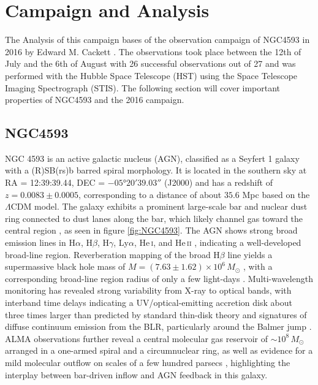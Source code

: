 \chapter{Campaign and Analysis}
\label{campaign_and_analysis}
The Analysis of this campaign bases of the observation campaign of NGC4593 in 2016 by Edward M. Cackett \parencite{cackett2018accretion}. The observations took place between the 12th of July and the 6th of August with 26 successful observations out of 27 and was performed with the Hubble Space Telescope (HST) using the Space Telescope Imaging Spectrograph (STIS). The following section will cover important properties of NGC4593 and the 2016 campaign.

\section{NGC4593}
\label{NGC4593}

NGC 4593 is an active galactic nucleus (AGN), classified as a Seyfert 1 galaxy with a \mbox{(R)SB(rs)b} barred spiral morphology. 
It is located in the southern sky at RA = 12:39:39.44, DEC = $-05$°$ 20' 39.03''$ (J2000) and has a redshift of $z = 0.0083 \pm 0.0005$, corresponding to a distance of about $35.6$ Mpc \parencite{simbaNGC4593} based on the $\Lambda$CDM model. 
The galaxy exhibits a prominent large-scale bar and nuclear dust ring connected to dust lanes along the bar, which likely channel gas toward the central region \parencite{mulchaey1997structure}, as seen in figure \ref{fig:NGC4593}. 
The AGN shows strong broad emission lines in  H$\alpha$,  H$\beta$,  H$\gamma$, Ly$\alpha$, He\,\textsc{i}, and He\,\textsc{ii} \parencite{bentz2015agn}, indicating a well-developed broad-line region. 
Reverberation mapping of the broad H$\beta$ line yields a supermassive black hole mass of $M = \left(7.63 \pm 1.62\right) \times 10^6\,M_\odot$ \parencite{bentz2015agn}, with a corresponding broad-line region radius of only a few light-days \parencite{denney2006ngc4593}. 
Multi-wavelength monitoring has revealed strong variability from X-ray to optical bands, with interband time delays indicating a UV/optical-emitting accretion disk about three times larger than predicted by standard thin-disk theory and signatures of diffuse continuum emission from the BLR, particularly around the Balmer jump \parencite{cackett2018accretion}. 
ALMA observations further reveal a central molecular gas reservoir of $\sim 10^8\,M_\odot$ arranged in a one-armed spiral and a circumnuclear ring, as well as evidence for a mild molecular outflow on scales of a few hundred parsecs \parencite{garcia2019alma}, highlighting the interplay between bar-driven inflow and AGN feedback in this galaxy. 


